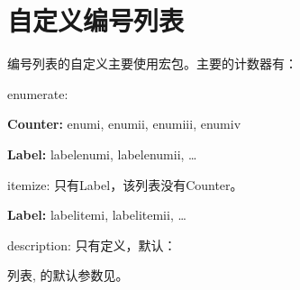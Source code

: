 \section{自定义编号列表}
\label{sec:list}
编号列表的自定义主要使用宏包。主要的计数器有：
\begin{feai}
\item enumerate:
  \begin{feai}
    \item \textbf{Counter:} enumi, enumii, enumiii, enumiv
    \item \textbf{Label:} labelenumi, labelenumii, \ldots
  \end{feai}
\item itemize: 只有Label，该列表没有Counter。 
  \begin{feai}
    \item \textbf{Label:} labelitemi, labelitemii, \ldots
  \end{feai}
\item description: 只有定义，默认：
\begin{latex}
\newcommand*{\descriptionlabel}[1]{\hspace\labelsep
    \normalfont\bfseries #1} %
\end{latex}
\end{feai}

列表, 的默认参数见。

